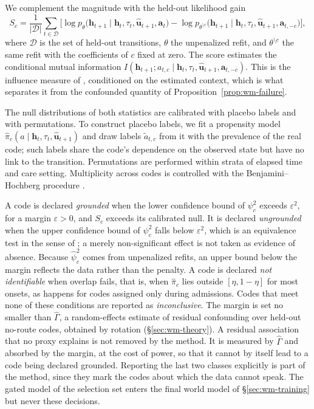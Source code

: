 We complement the magnitude with the held-out likelihood gain
\begin{equation}
\label{eq:wm-score}
S_c=\frac{1}{|\mathcal{D}|}\sum_{t\in\mathcal{D}}\Big[\log p_\theta\big(\mathbf{h}_{t+1}\mid\mathbf{h}_t,\tau_t,\hat{\mathbf{u}}_{t+1},\mathbf{a}_t\big)-\log p_{\theta^{\setminus c}}\big(\mathbf{h}_{t+1}\mid\mathbf{h}_t,\tau_t,\hat{\mathbf{u}}_{t+1},\mathbf{a}_{t,-c}\big)\Big],
\end{equation}
where $\mathcal{D}$ is the set of held-out transitions, $\theta$ the unpenalized refit, and $\theta^{\setminus c}$ the same refit with the coefficients of $c$ fixed at zero. The score estimates the conditional mutual information $I(\mathbf{h}_{t+1};a_{t,c}\mid\mathbf{h}_t,\tau_t,\hat{\mathbf{u}}_{t+1},\mathbf{a}_{t,-c})$. This is the influence measure of \citet{seitzer2021cai}, conditioned on the estimated context, which is what separates it from the confounded quantity of Proposition~\ref{prop:wm-failure}.

The null distributions of both statistics are calibrated with placebo labels and with permutations. To construct placebo labels, we fit a propensity model $\hat{\pi}_c(a\mid\mathbf{h}_t,\tau_t,\hat{\mathbf{u}}_{t+1})$ and draw labels $\tilde{a}_{t,c}$ from it with the prevalence of the real code; such labels share the code's dependence on the observed state but have no link to the transition. Permutations are performed within strata of elapsed time and care setting. Multiplicity across codes is controlled with the Benjamini--Hochberg procedure \citep{benjamini1995fdr}.

A code is declared \emph{grounded} when the lower confidence bound of $\psi^{2}_c$ exceeds $\varepsilon^{2}$, for a margin $\varepsilon>0$, and $S_c$ exceeds its calibrated null. It is declared \emph{ungrounded} when the upper confidence bound of $\psi^{2}_c$ falls below $\varepsilon^{2}$, which is an equivalence test in the sense of \citet{schuirmann1987tost}; a merely non-significant effect is not taken as evidence of absence. Because $\hat{\psi}^{2}_c$ comes from unpenalized refits, an upper bound below the margin reflects the data rather than the penalty. A code is declared \emph{not identifiable} when overlap fails, that is, when $\hat{\pi}_c$ lies outside $[\eta,1-\eta]$ for most onsets, as happens for codes assigned only during admissions. Codes that meet none of these conditions are reported as \emph{inconclusive}. The margin is set no smaller than $\hat{\Gamma}$, a random-effects estimate of residual confounding over held-out no-route codes, obtained by rotation (\S\ref{sec:wm-theory}). A residual association that no proxy explains is not removed by the method. It is measured by $\hat{\Gamma}$ and absorbed by the margin, at the cost of power, so that it cannot by itself lead to a code being declared grounded. Reporting the last two classes explicitly is part of the method, since they mark the codes about which the data cannot speak. The gated model of the selection set enters the final world model of \S\ref{sec:wm-training} but never these decisions.

